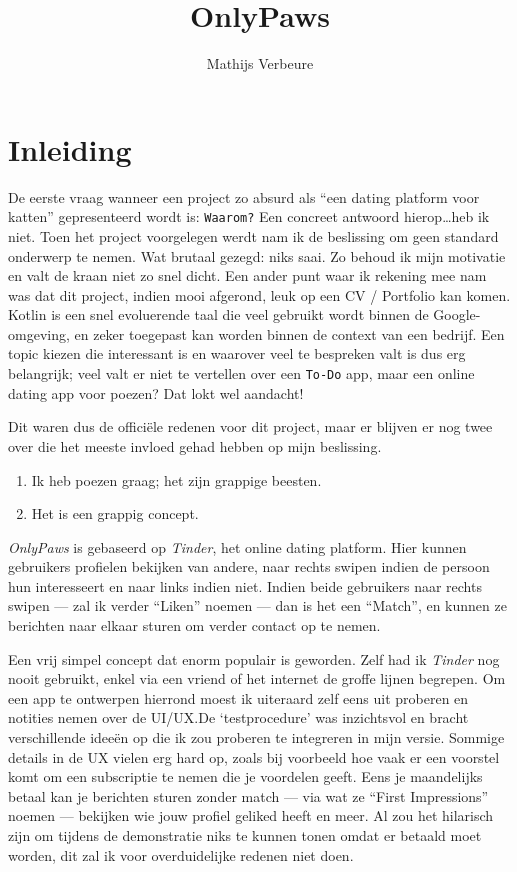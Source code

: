 \documentclass{report}
\title{OnlyPaws}
\author{Mathijs Verbeure}
\begin{document}
\maketitle

\tableofcontents

\chapter{Inleiding}
De eerste vraag wanneer een project zo absurd als ``een dating platform voor katten'' gepresenteerd wordt is: \verb|Waarom?| Een concreet antwoord hierop\dots heb ik niet.
Toen het project voorgelegen werdt nam ik de beslissing om geen standard onderwerp te nemen. Wat brutaal gezegd: niks saai.
Zo behoud ik mijn motivatie en valt de kraan niet zo snel dicht.
Een ander punt waar ik rekening mee nam was dat dit project, indien mooi afgerond, leuk op een CV / Portfolio kan komen. 
Kotlin is een snel evoluerende taal die veel gebruikt wordt binnen de Google-omgeving, en zeker toegepast kan worden binnen de context van een bedrijf.
Een topic kiezen die interessant is en waarover veel te bespreken valt is dus erg belangrijk; veel valt er niet te vertellen over een \verb|To-Do| app, maar een online dating app voor poezen? Dat lokt wel aandacht!

Dit waren dus de officiële redenen voor dit project, maar er blijven er nog twee over die het meeste invloed gehad hebben op mijn beslissing. 
\begin{enumerate}
    \item Ik heb poezen graag; het zijn grappige beesten.
    \item Het is een grappig concept.
\end{enumerate}


\textit{OnlyPaws} is gebaseerd op \textit{Tinder}\texttrademark, het online dating platform. Hier kunnen gebruikers profielen bekijken van andere, naar rechts swipen indien de persoon hun interesseert en naar links indien niet.
Indien beide gebruikers naar rechts swipen --- zal ik verder ``Liken'' noemen --- dan is het een ``Match'', en kunnen ze berichten naar elkaar sturen om verder contact op te nemen.

Een vrij simpel concept dat enorm populair is geworden. Zelf had ik \textit{Tinder} nog nooit gebruikt, enkel via een vriend of het internet de groffe lijnen begrepen.
Om een app te ontwerpen hierrond moest ik uiteraard zelf eens uit proberen en notities nemen over de UI/UX.\@ De `testprocedure' was inzichtsvol en bracht verschillende ideeën op die ik zou proberen te integreren in mijn versie.
Sommige details in de UX vielen erg hard op, zoals bij voorbeeld hoe vaak er een voorstel komt om een subscriptie te nemen die je voordelen geeft. Eens je maandelijks betaal kan je berichten sturen zonder match --- via wat ze ``First Impressions'' noemen --- bekijken wie jouw profiel geliked heeft en meer.
Al zou het hilarisch zijn om tijdens de demonstratie niks te kunnen tonen omdat er betaald moet worden, dit zal ik voor overduidelijke redenen niet doen. 
\end{document}
